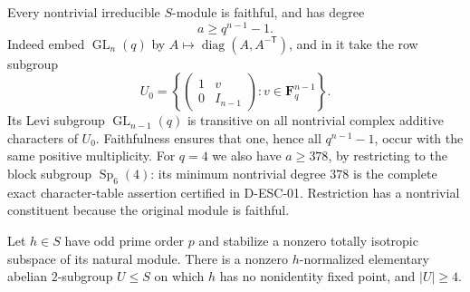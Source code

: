 Every nontrivial irreducible $S$-module is faithful, and has degree
\[
                          a\ge q^{n-1}-1.
\tag{HES.14}
\]
Indeed embed $\operatorname{GL}_n(q)$ by
$A\mapsto\operatorname{diag}(A,A^{-\mathsf T})$, and in it take the row
subgroup
\[
 U_0=\left\{\begin{pmatrix}1&v\\0&I_{n-1}\end{pmatrix}:
                   v\in\mathbf F_q^{n-1}\right\}.
\]
Its Levi subgroup $\operatorname{GL}_{n-1}(q)$ is transitive on all
nontrivial complex additive characters of $U_0$. Faithfulness ensures
that one, hence all $q^{n-1}-1$, occur with the same positive multiplicity.
For $q=4$ we also have $a\ge378$, by restricting to the block subgroup
$\operatorname{Sp}_6(4)$: its minimum nontrivial degree $378$ is the
complete exact character-table assertion certified in D-ESC-01.
Restriction has a nontrivial constituent because the original module
is faithful.

\begin{lemma}[D-HES-04a]
Let $h\in S$ have odd prime order $p$ and stabilize a nonzero totally
isotropic subspace of its natural module. There is a nonzero
$h$-normalized elementary abelian $2$-subgroup $U\le S$ on which $h$
has no nonidentity fixed point, and $|U|\ge4$.
\end{lemma}

